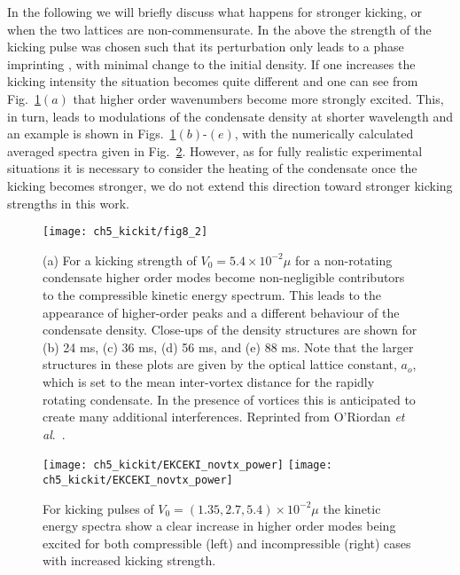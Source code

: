     In the following we will briefly discuss what happens for stronger kicking, or when the two lattices are non-commensurate. In the above the strength of the kicking pulse was chosen such that its perturbation only leads to a phase imprinting \cite{Vtx:Dobrek_pra_1999,BEC:Denschlag_science_2000}, with minimal change to the initial density. If one increases the kicking intensity the situation becomes quite different and one can see from Fig.~\ref{fig:kickp20k}$(a)$ that higher order wavenumbers become more strongly excited. This, in turn, leads to modulations of the condensate density at shorter wavelength and an example is shown in Figs.~\ref{fig:kickp20k}$(b)$-$(e)$, with the numerically calculated averaged spectra given in Fig.~\ref{fig:kick_compare_spec}. However, as for fully realistic experimental situations it is necessary to consider the heating of the condensate once the kicking becomes stronger, we do not extend this direction toward stronger kicking strengths in this work.

\begin{figure}
    \centering
	\texttt{[image: ch5\_kickit/fig8\_2]}
	\caption[Higher order modes induced by stronger kicking.]{(a) For a kicking strength of $V_0 = 5.4\times10^{-2}\mu$ for a non-rotating condensate higher order modes become non-negligible contributors to the compressible kinetic energy spectrum. This leads to the appearance of higher-order peaks and a different behaviour of the condensate density. Close-ups of the density structures are shown for (b) 24 ms, (c) 36 ms, (d) 56 ms, and (e) 88 ms. Note that the larger structures in these plots are given by the optical lattice constant, $a_o$, which is set to the mean inter-vortex distance for the rapidly rotating condensate. In the presence of vortices this is anticipated to create many additional interferences. Reprinted from O'Riordan {\textit{et al}.}~\cite{VTX:oriordan_pra_2016}.}
	\label{fig:kickp20k}
\end{figure}
\begin{figure}
    \centering
    \texttt{[image: ch5\_kickit/EKCEKI\_novtx\_power]}
    \texttt{[image: ch5\_kickit/EKCEKI\_novtx\_power]}
	\caption[Comparison of kinetic energy spectra for increased kicking strengths.]{For kicking pulses of $V_0 = (1.35,2.7,5.4)\times 10^{-2} \mu$ the kinetic energy spectra show a clear increase in higher order modes being excited for both compressible (left) and incompressible (right) cases with increased kicking strength.}\label{fig:kick_compare_spec}
\end{figure}

